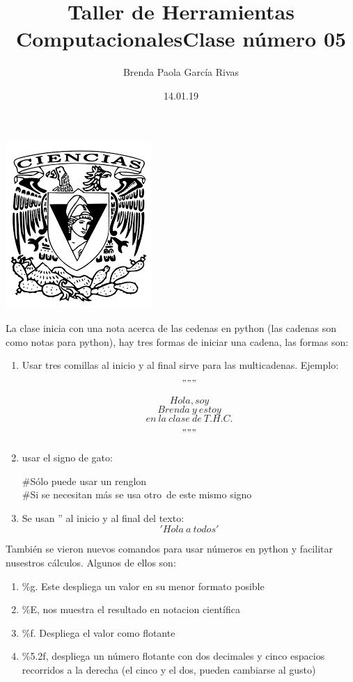 \documentclass[letterpaper, 12pt,oneside]{article}
\title{\huge\color{orange}Taller de Herramientas Computacionales}
\author{Brenda Paola García Rivas}
\date{14.01.19}
\begin{document}
	\maketitle
	\begin{center}
		\includegraphics[scale=0.98]{1.png}
	\end{center}
	\newpage
	\title{\huge Clase número 05\\}
	
	La clase inicia con una nota acerca de las cedenas en python (las cadenas son como notas para python), hay tres formas de iniciar una cadena, las formas son: 
	\begin{enumerate}
		\item 
		Usar tres comillas al inicio y al final sirve para las multicadenas. Ejemplo:	
		\["""\]
		\[Hola, soy\]
		\[Brenda\ y\ estoy\]
		\[en\ la\ clase\ de\ T.H.C.\]
		\["""\]	
		\item 
		usar el signo de gato:
		
		\#Sólo puede usar un renglon\\
		\#Si se necesitan más se usa otro\ de este mismo signo\\
		\item 
		Se usan '' al inicio y al final del texto:
		\['Hola\ a\ todos' \]
	\end{enumerate}

	También se vieron nuevos comandos para usar números en python y facilitar nusestros cálculos. Algunos de ellos son:
	\begin{enumerate}
		\item 
		\%g. Este despliega un valor en su menor formato posible
		\item 
		\%E, nos muestra el resultado en notacion científica
		\item 
		\%f. Despliega el valor como flotante
		\item 
		\%5.2f, despliega un número flotante con dos decimales y cinco espacios recorridos a la derecha (el cinco y el dos, pueden cambiarse al gusto)
	
	\end{enumerate}
	
\end{document}
